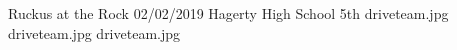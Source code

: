 \insertCompetition
{Ruckus at the Rock}
{02/02/2019}
{Hagerty High School}
{5th}
{driveteam.jpg}
{driveteam.jpg}
{driveteam.jpg}
{}
